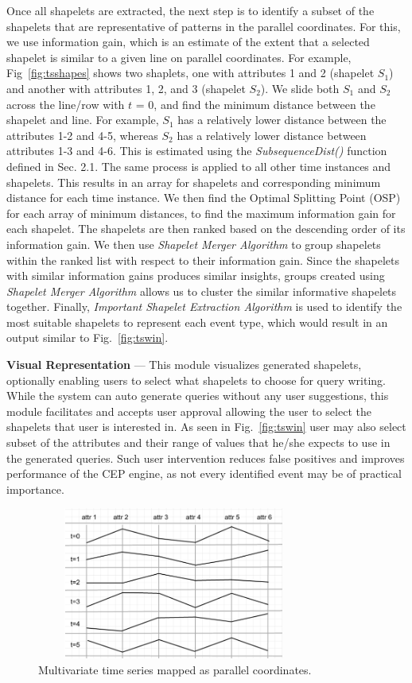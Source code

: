 \documentclass[conference]{IEEEtran}  %
\begin{document}
Once all shapelets are extracted, the next step is to identify a subset of the shapelets that are representative of patterns in the parallel coordinates. For this, we use information gain, which is an estimate of the extent that a selected shapelet is similar to a given line on parallel coordinates. For example, Fig~\ref{fig:tsshapes} shows two shaplets, one with attributes 1 and 2 (shapelet $S_1$) and another with attributes 1, 2, and 3 (shapelet $S_2$). We slide both $S_1$ and $S_2$ across the line/row with $t$ = 0, and find the minimum distance between the shapelet and line. For example, $S_1$ has a relatively lower distance between the attributes 1-2 and 4-5, whereas $S_2$ has a relatively lower distance between attributes 1-3 and 4-6. This is estimated using the \textit{SubsequenceDist()} function defined in Sec. 2.1. The same process is applied to all other time instances and shapelets. This results in an array for shapelets and corresponding minimum distance for each time instance. We then find the Optimal Splitting Point (OSP) \cite{IEEEexample:TimeSeriesShapelets} for each array of minimum distances, to find the maximum information gain for each shapelet. The shapelets are then ranked based on the descending order of its information gain. We then use \textit{Shapelet Merger Algorithm} to group shapelets within the ranked list with respect to their information gain. Since the shapelets with similar information gains produces similar insights, groups created using \textit{Shapelet Merger Algorithm} allows us to cluster the similar informative shapelets together. Finally, \textit{Important Shapelet Extraction Algorithm} is used to identify the most suitable shapelets to represent each event type, which would result in an output similar to Fig.~\ref{fig:tswin}.

\textbf{Visual Representation} --- This module visualizes generated shapelets, optionally enabling users to select what shapelets to choose for query writing. While the system can auto generate queries without any user suggestions, this module facilitates and accepts user approval allowing the user to select the shapelets that user is interested in. As seen in Fig.~\ref{fig:tswin} user may also select subset of the attributes and their range of values that he/she expects to use in the generated queries. Such user intervention reduces false positives and improves performance of the CEP engine, as not every identified event may be of practical importance.

\begin{figure}
\includegraphics[width=9cm,height=5cm]{multivariateTime.png}
\caption{Multivariate time series mapped as parallel coordinates.}
\label{fig:tsdata}
\end{figure}
\end{document}
